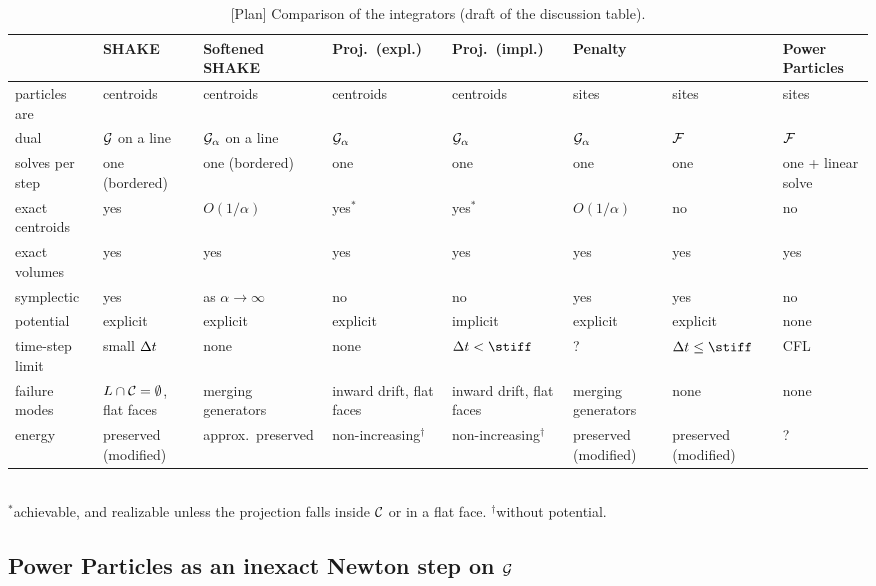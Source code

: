 \documentclass[main.tex]{subfiles}
\begin{document}
\begin{table}[t]
  \caption{[Plan] Comparison of the integrators (draft of the discussion table).}
  \label{tab:plan-comparison}
  \centering
  \footnotesize
  \setlength{\tabcolsep}{3pt}
  \begin{tabular}{@{}p{}p{}p{}p{}p{}p{}p{}p{}@{}}
    \toprule
    & SHAKE & Softened SHAKE & Proj.\ (expl.) & Proj.\ (impl.) & Penalty & \citet{Gallouet2018Lagrangian} & Power Particles \\
    \midrule
    particles are & centroids & centroids & centroids & centroids & sites & sites & sites \\
    dual & $\mathcal{G}$ on a line & $\mathcal{G}_\alpha$ on a line & $\mathcal{G}_\alpha$ & $\mathcal{G}_\alpha$ & $\mathcal{G}_\alpha$ & $\mathcal{F}$ & $\mathcal{F}$ \\
    solves per step & one (bordered) & one (bordered) & one & one & one & one & one + linear solve \\
    exact centroids & yes & $O(1/\alpha)$ & yes$^*$ & yes$^*$ & $O(1/\alpha)$ & no & no \\
    exact volumes & yes & yes & yes & yes & yes & yes & yes \\
    symplectic & yes & as $\alpha \to \infty$ & no & no & yes & yes & no \\
    potential & explicit & explicit & explicit & implicit & explicit & explicit & none \\
    time-step limit & small $\Delta t$ & none & none & $\tstep < \stiff$ & ? & $\tstep \le \stiff$ & CFL \\
    failure modes & $L \cap \mathcal{C} = \emptyset$, flat faces & merging generators & inward drift, flat faces & inward drift, flat faces & merging generators & none & none \\
    energy & preserved (modified) & approx.\ preserved & non-increasing$^\dagger$ & non-increasing$^\dagger$ & preserved (modified) & preserved (modified) & ? \\
    \bottomrule
  \end{tabular}
  \\[1mm]
  {\footnotesize $^*$achievable, and realizable unless the projection falls inside $\mathcal{C}$ or in a flat face. $^\dagger$without potential.}
\end{table}

\subsection*{Power Particles as an inexact Newton step on $\mathcal{G}$}
\end{document}
